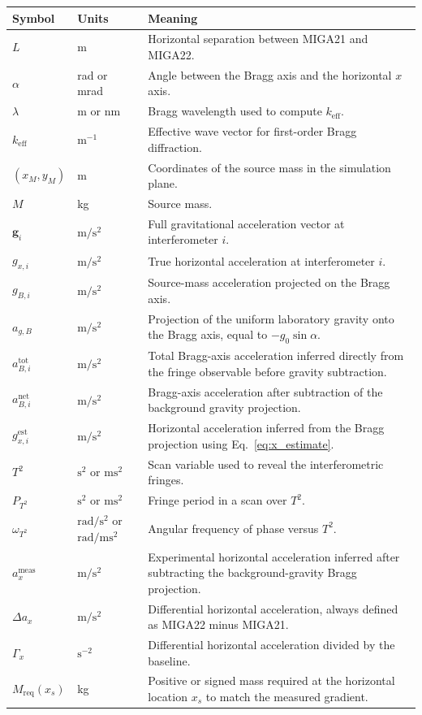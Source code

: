\documentclass[11pt]{article}
\begin{document}
\begin{center}
\begin{tabular}{>{\raggedright\arraybackslash}p{} >{\raggedright\arraybackslash}p{} >{\raggedright\arraybackslash}p{}}
\toprule
Symbol & Units & Meaning \\
\midrule
$L$ & m & Horizontal separation between MIGA21 and MIGA22. \\
$\alpha$ & rad or mrad & Angle between the Bragg axis and the horizontal $x$ axis. \\
$\lambda$ & m or nm & Bragg wavelength used to compute $k_{\mathrm{eff}}$. \\
$k_{\mathrm{eff}}$ & $\mathrm{m^{-1}}$ & Effective wave vector for first-order Bragg diffraction. \\
$(x_M, y_M)$ & m & Coordinates of the source mass in the simulation plane. \\
$M$ & kg & Source mass. \\
$\mathbf{g}_i$ & $\mathrm{m/s^2}$ & Full gravitational acceleration vector at interferometer $i$. \\
$g_{x,i}$ & $\mathrm{m/s^2}$ & True horizontal acceleration at interferometer $i$. \\
$g_{B,i}$ & $\mathrm{m/s^2}$ & Source-mass acceleration projected on the Bragg axis. \\
$a_{g,B}$ & $\mathrm{m/s^2}$ & Projection of the uniform laboratory gravity onto the Bragg axis, equal to $-g_0\sin\alpha$. \\
$a^{\mathrm{tot}}_{B,i}$ & $\mathrm{m/s^2}$ & Total Bragg-axis acceleration inferred directly from the fringe observable before gravity subtraction. \\
$a^{\mathrm{net}}_{B,i}$ & $\mathrm{m/s^2}$ & Bragg-axis acceleration after subtraction of the background gravity projection. \\
$g^{\mathrm{est}}_{x,i}$ & $\mathrm{m/s^2}$ & Horizontal acceleration inferred from the Bragg projection using Eq.~\eqref{eq:x_estimate}. \\
$T^2$ & $\mathrm{s^2}$ or $\mathrm{ms^2}$ & Scan variable used to reveal the interferometric fringes. \\
$P_{T^2}$ & $\mathrm{s^2}$ or $\mathrm{ms^2}$ & Fringe period in a scan over $T^2$. \\
$\omega_{T^2}$ & $\mathrm{rad/s^2}$ or $\mathrm{rad/ms^2}$ & Angular frequency of phase versus $T^2$. \\
$a^{\mathrm{meas}}_x$ & $\mathrm{m/s^2}$ & Experimental horizontal acceleration inferred after subtracting the background-gravity Bragg projection. \\
$\Delta a_x$ & $\mathrm{m/s^2}$ & Differential horizontal acceleration, always defined as MIGA22 minus MIGA21. \\
$\Gamma_x$ & $\mathrm{s^{-2}}$ & Differential horizontal acceleration divided by the baseline. \\
$M_{\mathrm{req}}(x_s)$ & kg & Positive or signed mass required at the horizontal location $x_s$ to match the measured gradient. \\
\bottomrule
\end{tabular}
\end{center}
\end{document}
